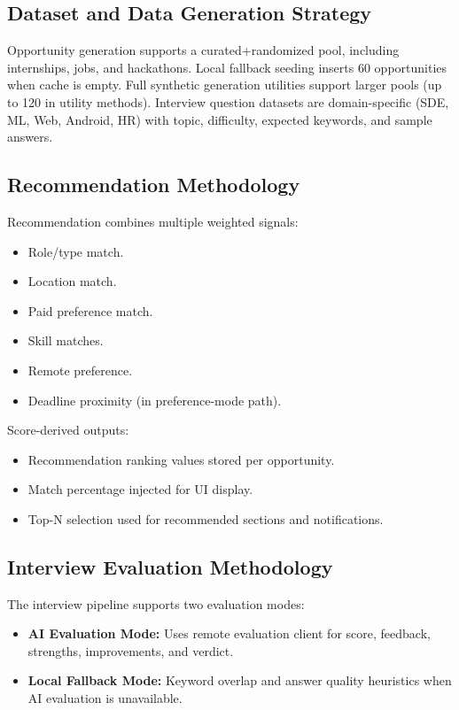 \documentclass[conference]{IEEEtran}
\begin{document}
\subsection{Dataset and Data Generation Strategy}

Opportunity generation supports a curated+randomized pool, including internships, jobs, and hackathons. Local fallback seeding inserts 60 opportunities when cache is empty. Full synthetic generation utilities support larger pools (up to 120 in utility methods). Interview question datasets are domain-specific (SDE, ML, Web, Android, HR) with topic, difficulty, expected keywords, and sample answers.

\subsection{Recommendation Methodology}

Recommendation combines multiple weighted signals:

\begin{itemize}
  \item Role/type match.
  \item Location match.
  \item Paid preference match.
  \item Skill matches.
  \item Remote preference.
  \item Deadline proximity (in preference-mode path).
\end{itemize}

Score-derived outputs:

\begin{itemize}
  \item Recommendation ranking values stored per opportunity.
  \item Match percentage injected for UI display.
  \item Top-N selection used for recommended sections and notifications.
\end{itemize}

\subsection{Interview Evaluation Methodology}

The interview pipeline supports two evaluation modes:

\begin{itemize}
  \item \textbf{AI Evaluation Mode:} Uses remote evaluation client for score, feedback, strengths, improvements, and verdict.
  \item \textbf{Local Fallback Mode:} Keyword overlap and answer quality heuristics when AI evaluation is unavailable.
\end{itemize}
\end{document}

